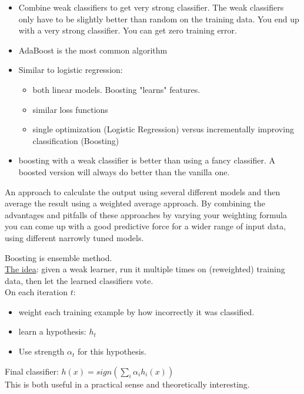 \begin{itemize}
	\item Combine	weak	classifiers	to get very strong classifier.  
		The weak classifiers only have to be slightly better than random on the training data. 
		You end up with a very strong classifier.  You can get zero training error. 
	\item AdaBoost is the most common algorithm
	\item Similar to logistic regression:
		\begin{itemize}
			\item both linear models.  Boosting "learns" features.  
			\item similar loss functions
			\item single optimization (Logistic Regression) versus incrementally improving classification (Boosting) 
		\end{itemize}
	\item  boosting with a weak classifier is better than using a fancy classifier. 
		A boosted version will always do better than the vanilla one. 
	\ 
\end{itemize}


An approach to calculate the output using several different models and then average the result using a weighted average approach. 
By combining the advantages and pitfalls of these approaches by varying your weighting formula you can come up with a good predictive force for a wider range of input data, using different narrowly tuned models.  %

Boosting is ensemble method. \hfill \\
\underline{The idea}: given a weak learner, run it multiple times on (reweighted) training data, 
	then let the learned classifiers vote.  \hfill \\
	
On each iteration $t$:
\begin{itemize}
	\item weight each training example by how incorrectly it was classified.
	\item learn a hypothesis: $h_t$
	\item Use strength $\alpha_t$ for this hypothesis. 
\end{itemize}
Final classifier: $\displaystyle h(x) = sign \left( \sum_i \alpha_i h_i(x)  \right)$ \hfill \\
This is both useful in a practical sense and theoretically interesting. 

